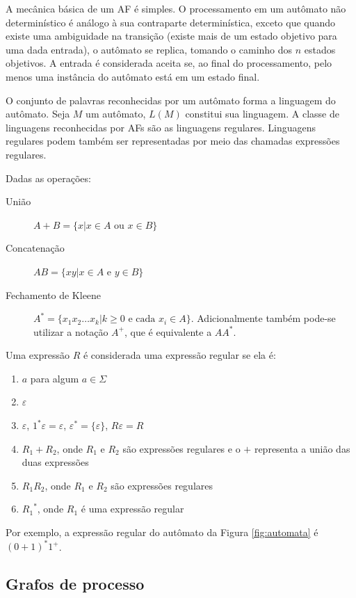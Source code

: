\documentclass[12pt,a4paper]{article}
\begin{document}
A mecânica básica de um AF é simples.
O processamento em um autômato não determinístico é análogo à sua contraparte
determinística, exceto que quando existe uma ambiguidade na transição (existe
mais de um estado objetivo para uma dada entrada), o autômato se replica, tomando
o caminho dos $n$ estados objetivos. A entrada é considerada aceita se, ao
final do processamento, pelo menos uma instância do autômato está em um
estado final.

O conjunto de palavras reconhecidas por um autômato forma a linguagem do
autômato. Seja $M$ um autômato, $L(M)$ constitui sua linguagem. A classe
de linguagens reconhecidas por AFs são as linguagens regulares.
Linguagens regulares podem também ser representadas por meio das chamadas
expressões regulares. 

Dadas as operações:

\begin{description}
\item[União] $A+B=\{x | x \in A \mbox{ ou } x \in B\}$
\item[Concatenação] $AB=\{xy | x \in A \mbox{ e } y \in B\}$
\item[Fechamento de Kleene] $A^*=\{x_1x_2 \ldots x_k | k \ge 0 \mbox{ e cada } x_i \in A\}$.
Adicionalmente também pode-se utilizar a notação $A^+$, que é equivalente a $AA^*$.
\end{description}

Uma expressão $R$ é considerada uma expressão regular 
se ela é:

\begin{enumerate}
\item $a$ para algum $a \in \Sigma$
\item $\varepsilon$
\item $\varepsilon$, $1^*\varepsilon=\varepsilon$, $\varepsilon^*=\{\varepsilon\}$, $R\varepsilon=R$
\item $R_1+R_2$, onde $R_1$ e $R_2$ são expressões regulares e
o $+$ representa a união das duas expressões
\item $R_1R_2$, onde $R_1$ e $R_2$ são expressões regulares
\item ${R_1}^*$, onde $R_1$ é uma expressão regular
\end{enumerate}

Por exemplo, a expressão regular do autômato da Figura \ref{fig:automata}
é $(0+1)^*1^+$.

\subsection{Grafos de processo}
\end{document}
